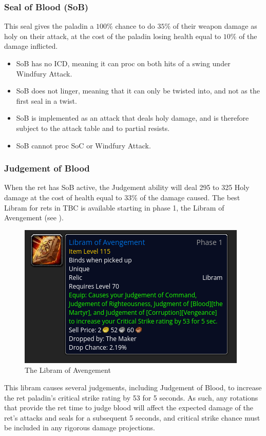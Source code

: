\documentclass[letterpaper,11pt]{article}
\begin{document}
	\subsubsection{Seal of Blood (SoB)}
	\label{sec:sob}
 	This seal gives the paladin a $100 \%$ chance to do $35 \%$ of their weapon damage as holy on their attack, at the cost of the paladin losing health equal to $10 \%$ of the damage inflicted.
	\begin{itemize}
		\item SoB has no ICD, meaning it can proc on both hits of a swing under Windfury Attack.
		\item SoB does not linger, meaning that it can only be twisted into, and not as the first seal in a twist.
		\item SoB is implemented as an attack that deals holy damage, and is therefore subject to the attack table and to partial resists.
		\item SoB cannot proc SoC or Windfury Attack.
	\end{itemize}
 	
	\subsubsection{Judgement of Blood}
	When the ret has SoB active, the Judgement ability will deal 295 to 325 Holy damage at the cost of health equal to $33 \%$ of the damage caused.
	The best Libram for rets in TBC is available starting in phase 1, the Libram of Avengement (see ).
	\begin{figure}[ht] 
		\centering \includegraphics[width=0.44\columnwidth]{figs/libram_of_avengement.png}
		\caption{The Libram of Avengement}
		\label{fig:loa}
	\end{figure}
	This libram causes several judgements, including Judgement of Blood, to increase the ret paladin's critical strike rating by 53 for 5 seconds.
	As such, any rotations that provide the ret time to judge blood will affect the expected damage of the ret's attacks and seals for a subsequent 5 seconds, and critical strike chance must be included in any rigorous damage projections.
	
\end{document}
